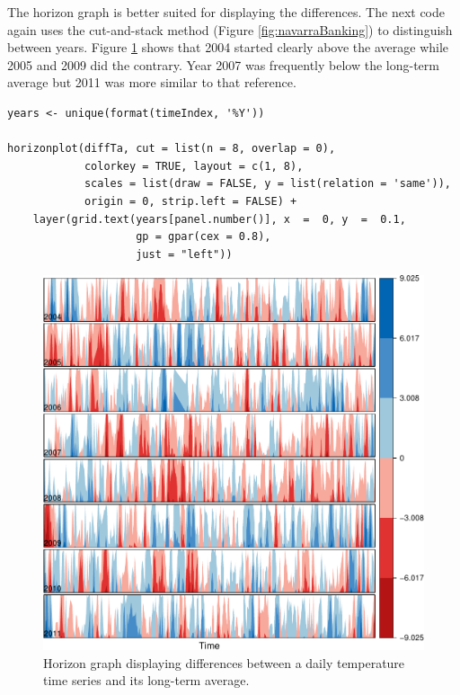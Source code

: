 The horizon graph is better suited for displaying the differences. The
next code again uses the cut-and-stack method (Figure
\ref{fig:navarraBanking}) to distinguish between years. Figure
\ref{fig:diffTa_horizon} shows that 2004 started clearly above the
average while 2005 and 2009 did the contrary. Year 2007 was frequently
below the long-term average but 2011 was more similar to that
reference.
\lstset{language=r,label= ,caption= ,captionpos=b,numbers=none}
\begin{lstlisting}
years <- unique(format(timeIndex, '%Y'))
  
horizonplot(diffTa, cut = list(n = 8, overlap = 0),
            colorkey = TRUE, layout = c(1, 8),
            scales = list(draw = FALSE, y = list(relation = 'same')),
            origin = 0, strip.left = FALSE) +
    layer(grid.text(years[panel.number()], x  =  0, y  =  0.1, 
                    gp = gpar(cex = 0.8),
                    just = "left"))
\end{lstlisting}

\begin{figure}[htbp]
\centering
\includegraphics[width=.9\linewidth]{figs/diffTa_horizon.pdf}
\caption{Horizon graph displaying differences between a daily temperature time series and its long-term average. \label{fig:diffTa_horizon}}
\end{figure}

